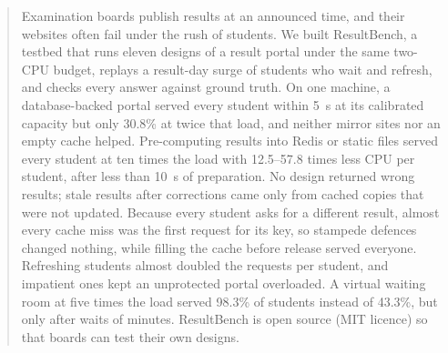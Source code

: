 \begin{abstract}
Examination boards publish results at an announced time, and their websites
often fail under the rush of students. We built ResultBench, a testbed that
runs eleven designs of a result portal under the same two-CPU budget, replays
a result-day surge of students who wait and refresh, and checks every answer
against ground truth. On one machine, a database-backed portal served every
student within \SI{5}{s} at its calibrated capacity but only 30.8\% at twice
that load, and neither mirror sites nor an empty cache helped. Pre-computing
results into Redis or static files served every student at ten times the load
with 12.5--57.8 times less CPU per student, after less than \SI{10}{s} of
preparation. No design returned wrong results; stale results after
corrections came only from cached copies that were not updated. Because every
student asks for a different result, almost every cache miss was the first
request for its key, so stampede defences changed nothing, while filling the
cache before release served everyone. Refreshing students almost doubled the
requests per student, and impatient ones kept an unprotected portal
overloaded. A virtual waiting room at five times the load served 98.3\% of
students instead of 43.3\%, but only after waits of minutes. ResultBench is
open source (MIT licence) so that boards can test their own designs.
\end{abstract}
